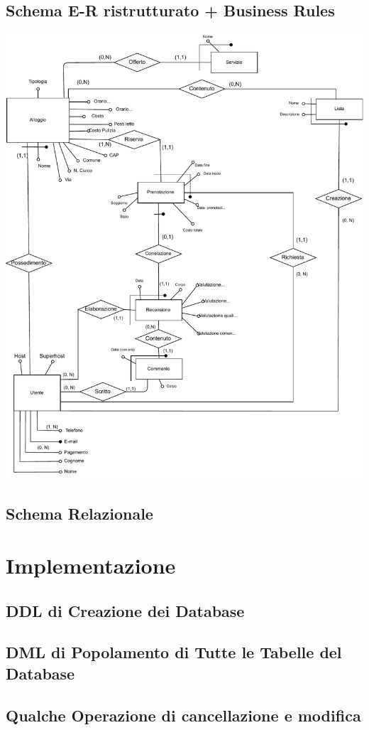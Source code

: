 \documentclass[letterpaper]{report}
\begin{document}
\section{Schema E-R ristrutturato + Business Rules}
\includegraphics[width=\textwidth]{resources/ER-Ristrutturato.pdf}


\section{Schema Relazionale}

\chapter{Implementazione}
\section{DDL di Creazione dei Database}
\section{DML di Popolamento di Tutte le Tabelle del Database}
\section{Qualche Operazione di cancellazione e modifica}
\end{document}

